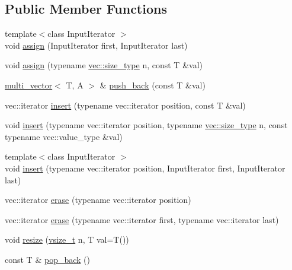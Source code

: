 \subsection*{Public Member Functions}
\begin{DoxyCompactItemize}
\item 
{\footnotesize template$<$class Input\+Iterator $>$ }\\void \hyperlink{classIceBRG_1_1multi__vector_ae1a89438380ac2b5aeb898e171ed9364}{assign} (Input\+Iterator first, Input\+Iterator last)
\item 
void \hyperlink{classIceBRG_1_1multi__vector_a5dfdcc780219ad607ced1e3e894945f5}{assign} (typename \hyperlink{lib_2IceBRG__main_2common_8h_a566c61f2ca17211f4ba8557f3f65e8d3}{vec\+::size\+\_\+type} n, const T \&val)
\item 
\hyperlink{classIceBRG_1_1multi__vector}{multi\+\_\+vector}$<$ T, A $>$ \& \hyperlink{classIceBRG_1_1multi__vector_a2f86b23b2ed4a23e20fb1292624e2da9}{push\+\_\+back} (const T \&val)
\item 
vec\+::iterator \hyperlink{classIceBRG_1_1multi__vector_a7db7da470a601e122fc74f2f9523ed04}{insert} (typename vec\+::iterator position, const T \&val)
\item 
void \hyperlink{classIceBRG_1_1multi__vector_ad7b717cff0ee7405af4837e29ecdf868}{insert} (typename vec\+::iterator position, typename \hyperlink{lib_2IceBRG__main_2common_8h_a566c61f2ca17211f4ba8557f3f65e8d3}{vec\+::size\+\_\+type} n, const typename vec\+::value\+\_\+type \&val)
\item 
{\footnotesize template$<$class Input\+Iterator $>$ }\\void \hyperlink{classIceBRG_1_1multi__vector_a8f74fe60c6358817ccf81d5c973cc93f}{insert} (typename vec\+::iterator position, Input\+Iterator first, Input\+Iterator last)
\item 
vec\+::iterator \hyperlink{classIceBRG_1_1multi__vector_aba38804447222d41c4ca7c49feac8cab}{erase} (typename vec\+::iterator position)
\item 
vec\+::iterator \hyperlink{classIceBRG_1_1multi__vector_a64188c90861ee5ad87b4ec9fcd265f20}{erase} (typename vec\+::iterator first, typename vec\+::iterator last)
\item 
void \hyperlink{classIceBRG_1_1multi__vector_a08b4f9d36263e9e35c753842716b04dc}{resize} (\hyperlink{classIceBRG_1_1multi__vector_abcc3d84f2afbb3e4239cea8c2c4923c3}{vsize\+\_\+t} n, T val=T())
\item 
const T \& \hyperlink{classIceBRG_1_1multi__vector_a5fafc6a7c33d88dc5d772365baf6cd40}{pop\+\_\+back} ()

\end{DoxyCompactItemize}
